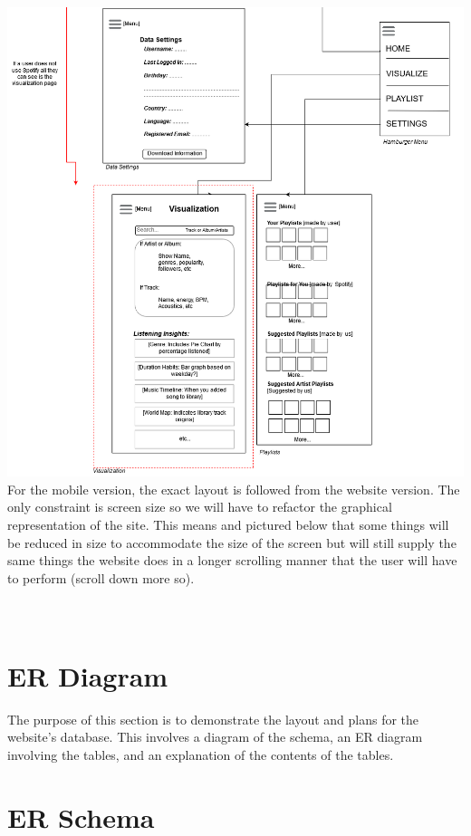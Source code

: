 \documentclass[letter, 11pt]{article}
\begin{document}
\includegraphics[scale=0.57,left]{storyboard_2_mobile.png}\\
For the mobile version, the exact layout is followed from the website version. The only constraint is screen size so we will have to refactor the graphical representation of the site. This means and pictured below that some things will be reduced in size to accommodate the size of the screen but will still supply the same things the website does in a longer scrolling manner that the user will have to perform (scroll down more so).\\
\\
\\

\section*{ER Diagram}

The purpose of this section is to demonstrate the layout and plans for the website's database. This involves a diagram of the schema, an ER diagram involving the tables, and an explanation of the contents of the tables.

\section*{ER Schema}
\end{document}
